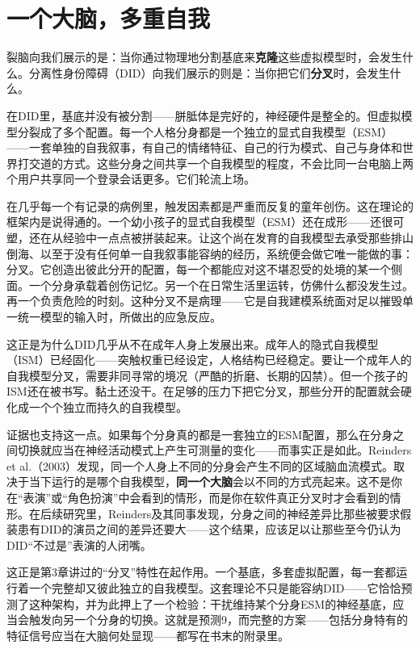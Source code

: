 \documentclass[11pt, twoside, openright]{book}
\begin{document}
\section*{一个大脑，多重自我}

裂脑向我们展示的是：当你通过物理地分割基底来\textbf{克隆}这些虚拟模型时，会发生什么。分离性身份障碍（DID）向我们展示的则是：当你把它们\textbf{分叉}时，会发生什么。

在DID里，基底并没有被分割------胼胝体是完好的，神经硬件是整全的。但虚拟模型分裂成了多个配置。每一个人格分身都是一个独立的显式自我模型（ESM）------一套单独的自我叙事，有自己的情绪特征、自己的行为模式、自己与身体和世界打交道的方式。这些分身之间共享一个自我模型的程度，不会比同一台电脑上两个用户共享同一个登录会话更多。它们轮流上场。

在几乎每一个有记录的病例里，触发因素都是严重而反复的童年创伤。这在理论的框架内是说得通的。一个幼小孩子的显式自我模型（ESM）还在成形------还很可塑，还在从经验中一点点被拼装起来。让这个尚在发育的自我模型去承受那些排山倒海、以至于没有任何单一自我叙事能容纳的经历，系统便会做它唯一能做的事：分叉。它创造出彼此分开的配置，每一个都能应对这不堪忍受的处境的某一个侧面。一个分身承载着创伤记忆。另一个在日常生活里运转，仿佛什么都没发生过。再一个负责危险的时刻。这种分叉不是病理------它是自我建模系统面对足以摧毁单一统一模型的输入时，所做出的应急反应。

这正是为什么DID几乎从不在成年人身上发展出来。成年人的隐式自我模型（ISM）已经固化------突触权重已经设定，人格结构已经稳定。要让一个成年人的自我模型分叉，需要非同寻常的境况（严酷的折磨、长期的囚禁）。但一个孩子的ISM还在被书写。黏土还没干。在足够的压力下把它分叉，那些分开的配置就会硬化成一个个独立而持久的自我模型。

证据也支持这一点。如果每个分身真的都是一套独立的ESM配置，那么在分身之间切换就应当在神经活动模式上产生可测量的变化------而事实正是如此。Reinders et al.（2003）发现，同一个人身上不同的分身会产生不同的区域脑血流模式。取决于当下运行的是哪个自我模型，\textbf{同一个大脑}会以不同的方式亮起来。这不是你在“表演”或“角色扮演”中会看到的情形，而是你在软件真正分叉时才会看到的情形。在后续研究里，Reinders及其同事发现，分身之间的神经差异比那些被要求假装患有DID的演员之间的差异还要大------这个结果，应该足以让那些至今仍认为DID“不过是”表演的人闭嘴。

这正是第3章讲过的“分叉”特性在起作用。一个基底，多套虚拟配置，每一套都运行着一个完整却又彼此独立的自我模型。这套理论不只是能容纳DID------它恰恰预测了这种架构，并为此押上了一个检验：干扰维持某个分身ESM的神经基底，应当会触发向另一个分身的切换。这就是预测9，而完整的方案------包括分身特有的特征信号应当在大脑何处显现------都写在书末的附录里。
\end{document}
